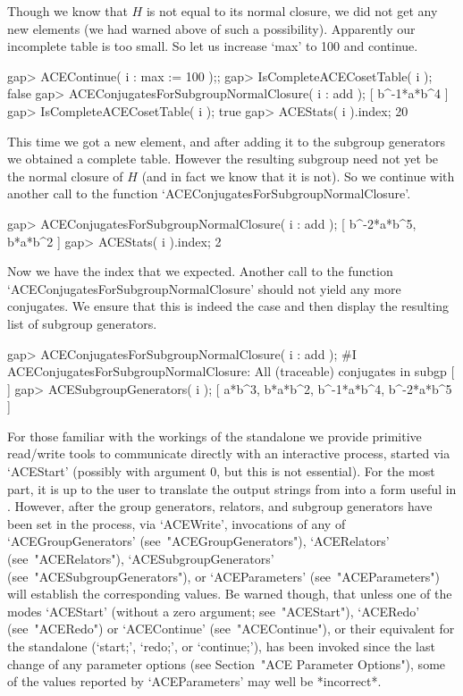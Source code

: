 Though we know that $H$ is not equal to its normal closure, we did not
get any new elements (we had warned  above  of  such  a  possibility).
Apparently our incomplete table is too small. So let us increase `max'
to 100 and continue.

\beginexample
gap> ACEContinue( i : max := 100 );;
gap> IsCompleteACECosetTable( i );
false
gap> ACEConjugatesForSubgroupNormalClosure( i : add );
[ b^-1*a*b^4 ]
gap> IsCompleteACECosetTable( i );
true
gap> ACEStats( i ).index;
20
\endexample

This time we got a new element, and after adding it  to  the  subgroup
generators  we  obtained  a  complete  table.  However  the  resulting
subgroup need not yet be the normal closure of $H$  (and  in  fact  we
know that it is not). So we continue with another call to the function
`ACEConjugatesForSubgroupNormalClosure'.

\beginexample
gap> ACEConjugatesForSubgroupNormalClosure( i : add );
[ b^-2*a*b^5, b*a*b^2 ]
gap> ACEStats( i ).index;
2
\endexample

Now we have the index that we expected. Another call to  the  function
`ACEConjugatesForSubgroupNormalClosure'  should  not  yield  any  more
conjugates. We ensure that this is indeed the case  and  then  display
the resulting list of subgroup generators.

\beginexample
gap> ACEConjugatesForSubgroupNormalClosure( i : add );
#I  ACEConjugatesForSubgroupNormalClosure: All (traceable) conjugates in subgp
[  ]
gap> ACESubgroupGenerators( i );
[ a*b^3, b*a*b^2, b^-1*a*b^4, b^-2*a*b^5 ]
\endexample


For those familiar with the  workings  of  the  {\ACE}  standalone  we
provide primitive read/write tools to  communicate  directly  with  an
interactive {\ACE} process,  started  via  `ACEStart'  (possibly  with
argument 0, but this is not essential). For the most part, it is up to
the user to translate the output  strings  from  {\ACE}  into  a  form
useful in {\GAP}. However, after the group generators,  relators,  and
subgroup  generators  have  been  set  in  the  {\ACE}  process,   via
`ACEWrite',    invocations    of    any    of     `ACEGroupGenerators'
(see~"ACEGroupGenerators"),     `ACERelators'     (see~"ACERelators"),
`ACESubgroupGenerators'       (see~"ACESubgroupGenerators"),        or
`ACEParameters' (see~"ACEParameters") will establish the corresponding
{\GAP} values.  Be  warned  though,  that  unless  one  of  the  modes
`ACEStart'  (without  a  zero  argument;  see~"ACEStart"),   `ACERedo'
(see~"ACERedo")  or  `ACEContinue'   (see~"ACEContinue"),   or   their
equivalent  for  the  standalone   {\ACE}   (`start;',   `redo;',   or
`continue;'), has been invoked since the last change of any  parameter
options (see Section~"ACE Parameter  Options"),  some  of  the  values
reported by `ACEParameters' may well be *incorrect*.

